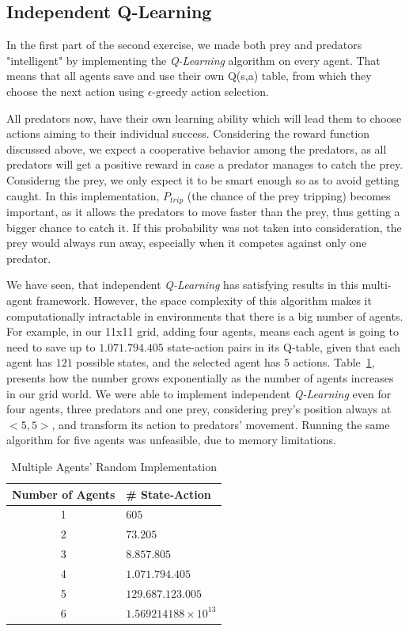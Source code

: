 \documentclass[a4paper,11pt]{article}
\begin{document}
\subsection{Independent Q-Learning}
In the first part of the second exercise, we made both prey and predators "intelligent" by implementing the \textit{Q-Learning} algorithm on every agent. That means that all agents save and use their own Q(s,a) table, from which they choose the next action using $\epsilon$-greedy action selection.

All predators now, have their own learning ability which will lead them to choose actions aiming to their individual success. Considering the reward function discussed above, we expect a cooperative behavior among the predators, as all predators will get a positive reward in case a predator manages to catch the prey. Considerng the prey, we only expect it to be smart enough so as to avoid getting caught. In this implementation, $P_{trip}$ (the chance of the prey tripping) becomes important, as it allows the predators to move faster than the prey, thus getting a bigger chance to catch it. If this probability was not taken into consideration, the prey would always run away, especially when it competes against only one predator.


We have seen, that independent \textit{Q-Learning} has satisfying results in this multi-agent framework. However, the space complexity of this algorithm makes it computationally intractable in environments that there is a big number of agents. For example, in our 11x11 grid, adding four agents, means  each agent is going to need to save up to $1.071.794.405$ state-action pairs in its Q-table, given that each agent has $121$ possible states, and the selected agent has $5$ actions. Table~\ref{table:complexity}, presents how the number grows exponentially as the number of agents increases in our grid world. We were able to implement independent \textit{Q-Learning} even for four agents, three predators and one prey, considering prey's position always at $<5,5>$, and transform its action to predators' movement. Running the same algorithm for five agents was unfeasible, due to memory limitations.


\begin{table}[h]
\begin{center}
\caption{Multiple Agents' Random Implementation}
\begin{tabular}{c l} 
\hline\hline               
\textbf{\small{Number of Agents}} & \textbf{\small{\# State-Action}} \\  
\hline
1 & $605$\\ 
2 & $73.205$\\
3 & $8.857.805$\\
4 & $1.071.794.405$\\
5 & $129.687.123.005$\\
6 & $1.569214188 \times 10^{13}$\\
\end{tabular}
\label{table:complexity} 
\end{center} 
\end{table} 
\end{document}
